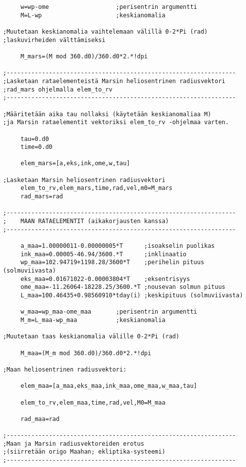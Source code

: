\documentclass[12pt, a4paper]{article}
\begin{document}
\begin{small}
\begin{verbatim}
     w=wp-ome                   ;perisentrin argumentti
     M=L-wp                     ;keskianomalia

;Muutetaan keskianomalia vaihtelemaan välillä 0-2*Pi (rad)
;laskuvirheiden välttämiseksi

     M_mars=(M mod 360.d0)/360.d0*2.*!dpi

;-----------------------------------------------------------------
;Lasketaan rataelementeistä Marsin heliosentrinen radiusvektori
;rad_mars ohjelmalla elem_to_rv
;-----------------------------------------------------------------

;Määritetään aika tau nollaksi (käytetään keskianomaliaa M) 
;ja Marsin rataelementit vektoriksi elem_to_rv -ohjelmaa varten.

     tau=0.d0
     time=0.d0

     elem_mars=[a,eks,ink,ome,w,tau]

;Lasketaan Marsin heliosentrinen radiusvektori
     elem_to_rv,elem_mars,time,rad,vel,m0=M_mars
     rad_mars=rad

;-----------------------------------------------------------------
;    MAAN RATAELEMENTIT (aikakorjausten kanssa)
;-----------------------------------------------------------------

     a_maa=1.00000011-0.00000005*T      ;isoakselin puolikas
     ink_maa=0.00005-46.94/3600.*T      ;inklinaatio
     wp_maa=102.94719+1198.28/3600*T    ;perihelin pituus (solmuviivasta)
     eks_maa=0.01671022-0.00003804*T    ;eksentrisyys
     ome_maa=-11.26064-18228.25/3600.*T ;nousevan solmun pituus
     L_maa=100.46435+0.98560910*tday(i) ;keskipituus (solmuviivasta)

     w_maa=wp_maa-ome_maa       ;perisentrin argumentti
     M_m=L_maa-wp_maa           ;keskianomalia

;Muutetaan taas keskianomalia välille 0-2*Pi (rad)

     M_maa=(M_m mod 360.d0)/360.d0*2.*!dpi

;Maan heliosentrinen radiusvektori:

     elem_maa=[a_maa,eks_maa,ink_maa,ome_maa,w_maa,tau]

     elem_to_rv,elem_maa,time,rad,vel,M0=M_maa

     rad_maa=rad

;-----------------------------------------------------------------
;Maan ja Marsin radiusvektoreiden erotus 
;(siirretään origo Maahan; ekliptika-systeemi)
;-----------------------------------------------------------------


\end{verbatim}
\end{small}
\end{document}
